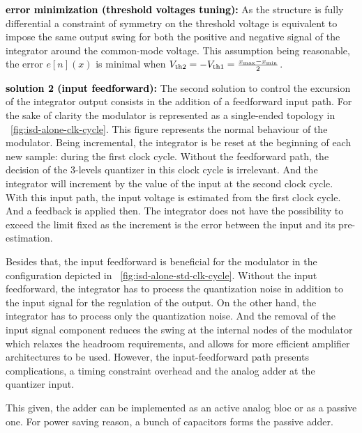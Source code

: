 \textbf{\textcolor{black}{error minimization (threshold voltages tuning):}}
As the structure is fully differential a constraint of symmetry on the threshold voltage is equivalent to impose the same output swing for both the positive and negative signal of the integrator around the common-mode voltage. This assumption being reasonable, the error \(e[n](x) \) is minimal when \(V_{\rm th2}=-V_{\rm th1}=\frac{x_{\max}-x_{\min}}{2} \).

\textbf{\textcolor{black}{solution 2 (input feedforward):}}
The second solution to control the excursion of the integrator output consists in the addition of a feedforward input path. For the sake of clarity the modulator is represented as a single-ended topology in \figurename~\ref{fig:isd-alone-clk-cycle}. This figure represents the normal behaviour of the modulator. Being incremental, the integrator is be reset at the beginning of each new sample: during the first clock cycle. Without the feedforward path, the decision of the 3-levels quantizer in this clock cycle is irrelevant. And the integrator will increment by the value of the input at the second clock cycle. With this input path, the input voltage is estimated from the first clock cycle. And a feedback is applied then. The integrator does not have the possibility to exceed the limit fixed as the increment is the error between the input and its pre-estimation.

Besides that, the input feedforward is beneficial for the modulator in the configuration depicted in \figurename~\ref{fig:isd-alone-std-clk-cycle}. Without the input feedforward, the integrator has to process the quantization noise in addition to the input signal for the regulation of the output. On the other hand, the integrator has to process only the quantization noise. And the removal of the input signal component reduces the swing at the internal nodes of the modulator which relaxes the headroom requirements, and allows for more efficient amplifier architectures to be used. However, the input-feedforward path presents complications, a timing constraint overhead and the analog adder at the quantizer input.

This given, the adder can be implemented as an active analog bloc or as a passive one. For power saving reason, a bunch of capacitors forms the passive adder.

